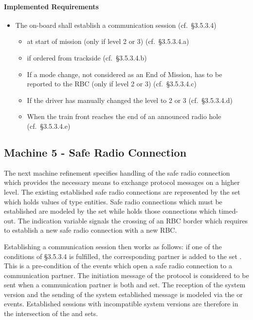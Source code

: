 \documentclass{template/openetcs_article}
\begin{document}
\paragraph{Implemented Requirements}
\label{sec:impl-requ-3}

\begin{itemize}
\item The on-board shall establish a communication session (cf.~§3.5.3.4)
  \begin{itemize}
  \item at start of mission (only if level 2 or 3) (cf.~§3.5.3.4.a)
  \item if ordered from trackside (cf.~§3.5.3.4.b)
  \item If a mode change, not considered as an End of Mission, has to be
    reported to the RBC (only if level 2 or 3) (cf.~§3.5.3.4.c)
  \item If the driver has manually changed the level to 2 or 3 (cf.~§3.5.3.4.d)
  \item When the train front reaches the end of an announced radio hole
    (cf.~§3.5.3.4.e)
  \end{itemize}
\end{itemize}

%

\subsection{Machine 5 - Safe Radio Connection}
\label{sec:machine-5-safe}

The next machine refinement specifies handling of the safe radio connection
which provides the necessary means to exchange protocol messages on a higher
level. The existing established safe radio connections are represented by the
set  which holds values of type entities. Safe radio
connections which must be established are modeled by the set
 while  holds
those connections which timed-out. The indication variable
 signals the crossing of an RBC border which requires
to establish a new safe radio connection with a new RBC.

Establishing a communication session then works as follows: if one of the
conditions of §3.5.3.4 is fulfilled, the corresponding partner is added to the
set . This is a pre-condition of the events which open a safe
radio connection to a communication partner. The initiation message of the
protocol is considered to be sent when a communication partner is both
 and  set. The reception of the system
version and the sending of the system established message is modeled via the
 or
 events. Established sessions with
incompatible system versions are therefore in the intersection of the
 and  sets.
\end{document}
